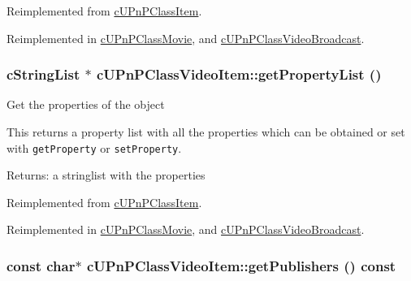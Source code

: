 Reimplemented from \hyperlink{classcUPnPClassItem_31f7010baa65cc25b95a864f05eb4e62}{cUPnPClassItem}.

Reimplemented in \hyperlink{classcUPnPClassMovie_b4c1d5a973856469b93d2033b65d7ba2}{cUPnPClassMovie}, and \hyperlink{classcUPnPClassVideoBroadcast_e1d13a13de094337cea6be214c4da0f0}{cUPnPClassVideoBroadcast}.\hypertarget{classcUPnPClassVideoItem_9dc397419b45535a3e6a676667b619a4}{
\subsubsection[{getPropertyList}]{\setlength{\rightskip}{0pt plus 5cm}cStringList $\ast$ cUPnPClassVideoItem::getPropertyList ()}}
\label{classcUPnPClassVideoItem_9dc397419b45535a3e6a676667b619a4}


Get the properties of the object

This returns a property list with all the properties which can be obtained or set with {\tt getProperty} or {\tt setProperty}.

\begin{Desc}
\item[Returns:]a stringlist with the properties \end{Desc}


Reimplemented from \hyperlink{classcUPnPClassItem_add0c9d378036e270e6f99d8d1409e3b}{cUPnPClassItem}.

Reimplemented in \hyperlink{classcUPnPClassMovie_b62e6dac175090b82c47f955e29c146c}{cUPnPClassMovie}, and \hyperlink{classcUPnPClassVideoBroadcast_192f6a04c87fe8d56f99c71337cf0f68}{cUPnPClassVideoBroadcast}.\hypertarget{classcUPnPClassVideoItem_797dc99dd12b77af641b266ada7cb1dc}{
\subsubsection[{getPublishers}]{\setlength{\rightskip}{0pt plus 5cm}const char$\ast$ cUPnPClassVideoItem::getPublishers () const}}
\label{classcUPnPClassVideoItem_797dc99dd12b77af641b266ada7cb1dc}


